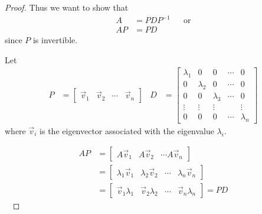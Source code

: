 \begin{proof}
Thus we want to show that 
\begin{align*}
A & = P D P^{-1} && \text{or} \\
A P & = P D  
\end{align*}
since $P$ is invertible. 


Let 
% 
\begin{align*}
P & = \begin{bmatrix}
\vec{v}_1 & \vec{v}_2 &  \cdots & \vec{v}_n
\end{bmatrix}
& D & = \begin{bmatrix}
\lambda_1 & 0 & 0 & \cdots & 0 \\
0 & \lambda_2 & 0 & \cdots & 0 \\
0 & 0 & \lambda_3 & \cdots & 0 \\
\vdots & \vdots & \vdots &  & \vdots \\
0 & 0 & 0 & \cdots & \lambda_n 
\end{bmatrix}
\end{align*}
where $\vec{v}_i$ is the eigenvector associated with the eigenvalue $\lambda_i$.  

% 
\begin{align*}
A P & = \begin{bmatrix}
A \vec{v}_1 & A \vec{v}_2 & \cdots A \vec{v}_n 
\end{bmatrix} \\
& = \begin{bmatrix}
\lambda_1  \vec{v}_1 &  \lambda_2 \vec{v}_2 & \cdots & \lambda_n \vec{v}_n 
\end{bmatrix} \\
& = \begin{bmatrix}
\vec{v}_1 \lambda_1 & \vec{v}_2 \lambda_2 & \cdots & \vec{v}_n \lambda_n 
\end{bmatrix}
= P D
\end{align*}
~
\end{proof} 

